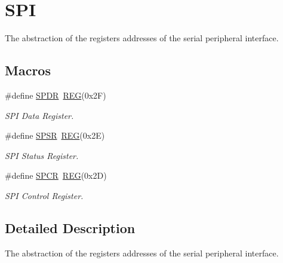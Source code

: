 \hypertarget{group__SPIMCAL}{\section{S\+P\+I}
\label{group__SPIMCAL}
}


The abstraction of the registers addresses of the serial peripheral interface.  


\subsection*{Macros}
\begin{DoxyCompactItemize}
\item 
\hypertarget{group__SPIMCAL_gaaa19e23820c6a7dc08c2b6eb758ff6ef}{\#define \hyperlink{group__SPIMCAL_gaaa19e23820c6a7dc08c2b6eb758ff6ef}{S\+P\+D\+R}~\hyperlink{group__MCAL_ga72e45020e46f285689db51c46f273403}{R\+E\+G}(0x2\+F)}\label{group__SPIMCAL_gaaa19e23820c6a7dc08c2b6eb758ff6ef}

\begin{DoxyCompactList}\small\item\em S\+P\+I Data Register. \end{DoxyCompactList}\item 
\hypertarget{group__SPIMCAL_ga1161ceb1b138c213bfcda0e6733a01ab}{\#define \hyperlink{group__SPIMCAL_ga1161ceb1b138c213bfcda0e6733a01ab}{S\+P\+S\+R}~\hyperlink{group__MCAL_ga72e45020e46f285689db51c46f273403}{R\+E\+G}(0x2\+E)}\label{group__SPIMCAL_ga1161ceb1b138c213bfcda0e6733a01ab}

\begin{DoxyCompactList}\small\item\em S\+P\+I Status Register. \end{DoxyCompactList}\item 
\hypertarget{group__SPIMCAL_gaaa7607bee4e38d1f8732b63bea2206dd}{\#define \hyperlink{group__SPIMCAL_gaaa7607bee4e38d1f8732b63bea2206dd}{S\+P\+C\+R}~\hyperlink{group__MCAL_ga72e45020e46f285689db51c46f273403}{R\+E\+G}(0x2\+D)}\label{group__SPIMCAL_gaaa7607bee4e38d1f8732b63bea2206dd}

\begin{DoxyCompactList}\small\item\em S\+P\+I Control Register. \end{DoxyCompactList}\end{DoxyCompactItemize}


\subsection{Detailed Description}
The abstraction of the registers addresses of the serial peripheral interface. 

